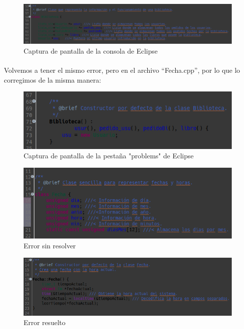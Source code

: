 \begin{figure}[H]
	\centering
	\includegraphics[scale=0.45]{img/captura5.png}
	\caption{Captura de pantalla de la consola de Eclipse}
	\label{captura5}
\end{figure}

\paragraph{}Volvemos a tener el mismo error, pero en el archivo “Fecha.cpp”, por lo que lo corregimos de la misma manera:

\begin{figure}[H]
	\centering
	\includegraphics[scale=0.47]{img/captura6.png}
	\caption{Captura de pantalla de la pestaña "problems" de Eclipse}
	\label{captura6}
\end{figure}

\begin{figure}[H]
	\centering
	\includegraphics[scale=1]{img/captura7.png}
	\caption{Error sin resolver}
	\label{captura7}
\end{figure}

\begin{figure}[H]
	\centering
	\includegraphics[scale=1]{img/captura8.png}
	\caption{Error resuelto}
	\label{captura8}
\end{figure}

